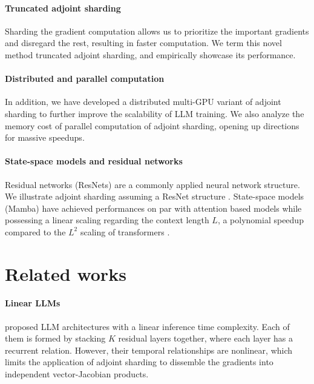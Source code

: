 \documentclass{article}
\begin{document}
\paragraph{Truncated adjoint sharding} Sharding the gradient computation allows us to prioritize the important gradients and disregard the rest, resulting in faster computation. We term this novel method truncated adjoint sharding, and empirically showcase its performance. 

\paragraph{Distributed and parallel computation} In addition, we have developed a distributed multi-GPU variant of adjoint sharding to further improve the scalability of LLM training. We also analyze the memory cost of parallel computation of adjoint sharding, opening up directions for massive speedups.

\paragraph{State-space models and residual networks} Residual networks (ResNets) are a commonly applied neural network structure. We illustrate adjoint sharding assuming a ResNet structure \citep{he2015deepresiduallearningimage}. State-space models (Mamba) have achieved performances on par with attention based models while possessing a linear scaling regarding the context length $L$, a polynomial speedup compared to the $L^2$ scaling of transformers \cite{vaswani2023attentionneed, gu2024mamba1}. 

\section{Related works}
\paragraph{Linear LLMs}
\citep{de2024griffinmixinggatedlinear, beck2024xlstmextendedlongshortterm, peng2023rwkvreinventingrnnstransformer} proposed LLM architectures with a linear inference time complexity. Each of them is formed by stacking $K$ residual layers together, where each layer has a recurrent relation. However, their temporal relationships are nonlinear, which limits the application of adjoint sharding to dissemble the gradients into independent vector-Jacobian products.
\end{document}
